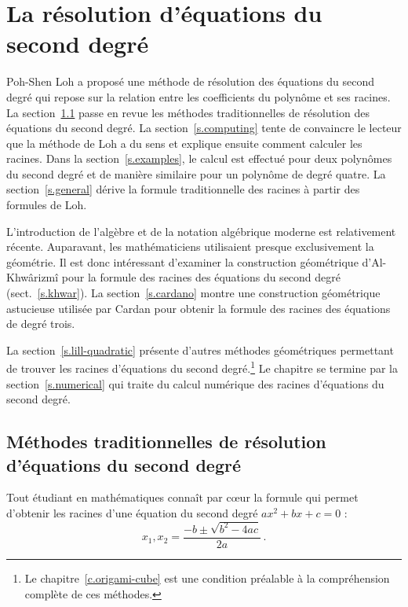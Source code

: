 \chapter{La résolution d'équations  du second degré}\label{c.quadratic}





Poh-Shen Loh a proposé une méthode de résolution des équations du second degré qui repose sur la  relation entre les coefficients du polynôme et ses racines. La section~\ref{s.traditional} passe en revue les méthodes traditionnelles de résolution des équations du second degré. 
La section~\ref{s.computing} tente de convaincre le lecteur que la méthode de Loh a du sens et explique ensuite comment calculer les racines. Dans la section~\ref{s.examples}, le calcul est effectué pour deux polynômes du second degré et de manière similaire pour un polynôme de degré quatre. La section~\ref{s.general} dérive la formule traditionnelle des racines à partir des formules de Loh.

L'introduction de l'algèbre et de la notation algébrique moderne est relativement récente. Auparavant, les mathématiciens utilisaient presque exclusivement la géométrie. Il est donc intéressant d'examiner la construction géométrique d'Al-Khwârizmî  pour la formule des racines des équations du second degré (sect.~\ref{s.khwar}). La section~\ref{s.cardano} montre une construction géométrique astucieuse utilisée par Cardan pour obtenir la formule des racines des équations de degré trois.

La section~\ref{s.lill-quadratic} présente d'autres méthodes géométriques permettant de trouver les racines d'équations du second degré.\footnote{Le chapitre~\ref{c.origami-cube} est une condition préalable à la compréhension complète de ces méthodes.} Le chapitre se termine par la section~\ref{s.numerical} qui traite du calcul numérique des racines d'équations du second degré.

\section{Méthodes traditionnelles de résolution d'équations du second degré}\label{s.traditional}

Tout étudiant en mathématiques connaît par cœur la formule qui permet d'obtenir les racines d'une équation du second degré $ax^2+bx+c=0$ :
\[
x_1, x_2 = \frac{-b\pm\sqrt{b^2-4ac}}{2a}\,.
\]                      



